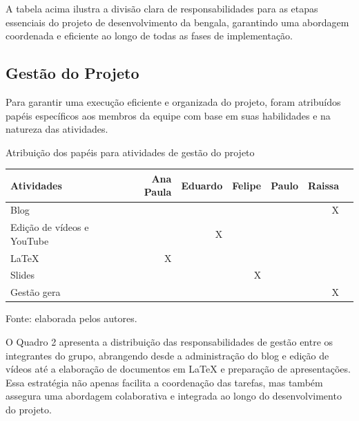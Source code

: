     A tabela acima ilustra a divisão clara de responsabilidades para as etapas essenciais do projeto de desenvolvimento da bengala, garantindo uma abordagem coordenada e eficiente ao longo de todas as fases de implementação.
   
    \subsection{Gestão do Projeto}
    Para garantir uma execução eficiente e organizada do projeto, foram atribuídos papéis específicos aos membros da equipe com base em suas habilidades e na natureza das atividades. 
        \begin{quadro}[!ht]    
            \captionsetup{width=1.0\textwidth} %
            \caption{Atribuição dos papéis para atividades de gestão do projeto}    
            \begin{tabular}{lrrrrrr}
                \toprule
                Atividades & Ana Paula & Eduardo & Felipe & Paulo & Raissa \\
                \midrule
                Blog                                &   &   &     &   & X \\
                Edição de vídeos e YouTube          &   & X &   &      &   \\
                LaTeX                               & X &   &   &      &   \\
                Slides                              &   &   & X &      &   \\
                Gestão gera                         &   &   &   &      & X \\
                \bottomrule
            \end{tabular}
            \caption*{Fonte: elaborada pelos autores.} %
        \end{quadro}
        O Quadro 2 apresenta a distribuição das responsabilidades de gestão entre os integrantes do grupo, abrangendo desde a administração do blog e edição de vídeos até a elaboração de documentos em LaTeX e preparação de apresentações. Essa estratégia não apenas facilita a coordenação das tarefas, mas também assegura uma abordagem colaborativa e integrada ao longo do desenvolvimento do projeto.




